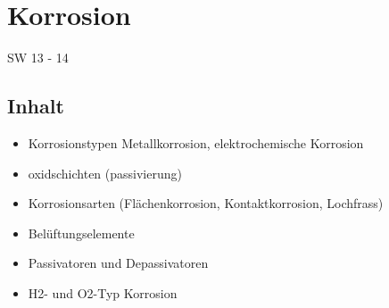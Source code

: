\section{Korrosion}{SW 13 - 14}

\subsection{Inhalt}
\begin{itemize}
\item Korrosionstypen Metallkorrosion, elektrochemische Korrosion
\item oxidschichten (passivierung)
\item Korrosionsarten (Flächenkorrosion, Kontaktkorrosion, Lochfrass)
\item Belüftungselemente
\item Passivatoren und Depassivatoren
\item H2- und O2-Typ Korrosion
\end{itemize}

